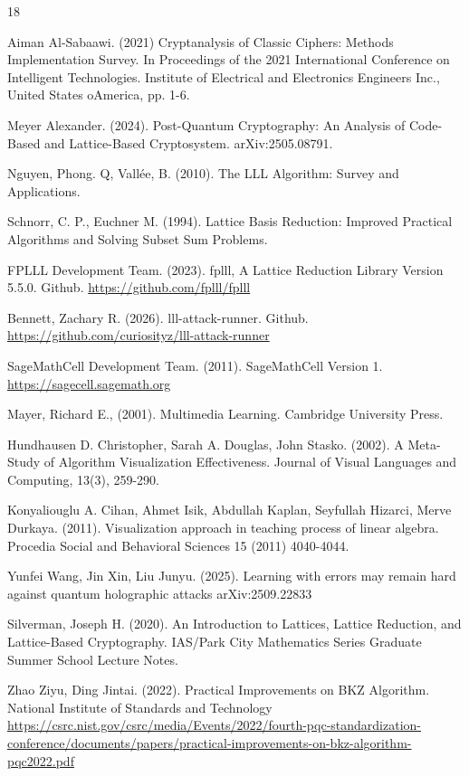 \documentclass[runningheads]{llncs}
\begin{document}
\begin{thebibliography}{18}

Aiman Al-Sabaawi. (2021) Cryptanalysis of Classic Ciphers: Methods Implementation Survey. In Proceedings of the 2021 International Conference on Intelligent Technologies. Institute of Electrical and Electronics Engineers Inc., United States oAmerica, pp. 1-6.

Meyer Alexander. (2024). Post-Quantum Cryptography: An Analysis of Code-Based and Lattice-Based Cryptosystem. arXiv:2505.08791. 

Nguyen, Phong. Q, Vallée, B. (2010). The LLL Algorithm: Survey and Applications.

Schnorr, C. P., Euchner M. (1994). Lattice Basis Reduction: Improved Practical Algorithms and Solving Subset Sum Problems. 

FPLLL Development Team. (2023). fplll, A Lattice Reduction Library Version 5.5.0. Github.
\url{https://github.com/fplll/fplll}

Bennett, Zachary R. (2026). lll-attack-runner. Github.
\url{https://github.com/curiosityz/lll-attack-runner}

SageMathCell Development Team. (2011). SageMathCell Version 1.  
\url{https://sagecell.sagemath.org}

Mayer, Richard E., (2001). Multimedia Learning. Cambridge University Press.

Hundhausen D. Christopher, Sarah A. Douglas, John Stasko. (2002). A Meta-Study of Algorithm Visualization Effectiveness. Journal of Visual Languages and Computing, 13(3), 259-290. 

Konyaliouglu A. Cihan, Ahmet Isik, Abdullah Kaplan, Seyfullah Hizarci, Merve Durkaya. (2011). Visualization approach in teaching process of linear algebra. Procedia Social and Behavioral Sciences 15 (2011) 4040-4044. 

Yunfei Wang, Jin Xin, Liu Junyu. (2025). Learning with errors may remain hard against quantum holographic attacks arXiv:2509.22833

Silverman, Joseph H. (2020). An Introduction to Lattices, Lattice Reduction, and Lattice-Based Cryptography. IAS/Park City Mathematics Series Graduate Summer School Lecture Notes. 

Zhao Ziyu, Ding Jintai. (2022). Practical Improvements on BKZ Algorithm. National Institute of Standards and Technology \url{https://csrc.nist.gov/csrc/media/Events/2022/fourth-pqc-standardization-conference/documents/papers/practical-improvements-on-bkz-algorithm-pqc2022.pdf}


\end{thebibliography}
\end{document}
